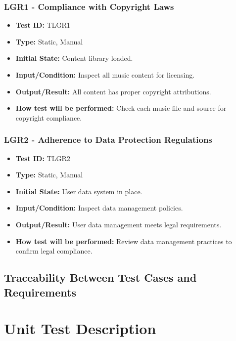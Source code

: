 \documentclass[12pt, titlepage]{article}
\begin{document}
\subsubsection{LGR1 - Compliance with Copyright Laws}
\begin{itemize}
    \item \textbf{Test ID:} TLGR1
    \item \textbf{Type:} Static, Manual
    \item \textbf{Initial State:} Content library loaded.
    \item \textbf{Input/Condition:} Inspect all music content for licensing.
    \item \textbf{Output/Result:} All content has proper copyright attributions.
    \item \textbf{How test will be performed:} Check each music file and source for copyright compliance.
\end{itemize}

\subsubsection{LGR2 - Adherence to Data Protection Regulations}
\begin{itemize}
    \item \textbf{Test ID:} TLGR2
    \item \textbf{Type:} Static, Manual
    \item \textbf{Initial State:} User data system in place.
    \item \textbf{Input/Condition:} Inspect data management policies.
    \item \textbf{Output/Result:} User data management meets legal requirements.
    \item \textbf{How test will be performed:} Review data management practices to confirm legal compliance.
\end{itemize}

\subsection{Traceability Between Test Cases and Requirements}


\section{Unit Test Description}
\end{document}
